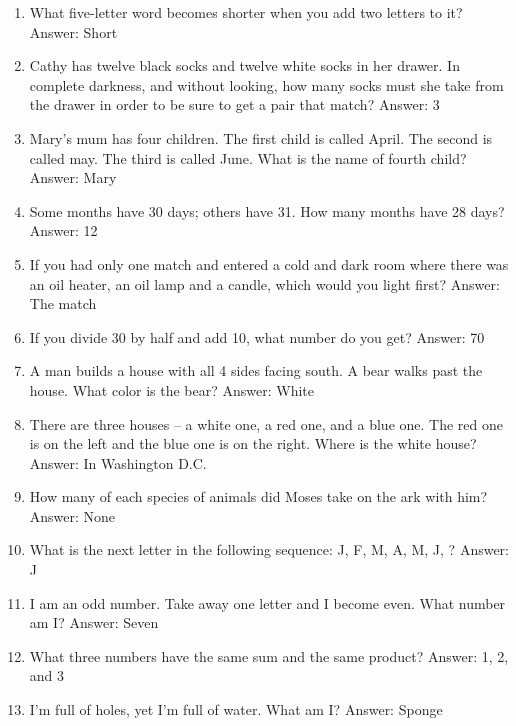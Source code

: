 \documentclass[11pt]{article}
\begin{document}
\begin{enumerate}[label = \arabic*. ]
\item What five-letter word becomes shorter when you add two letters to it? \hfill Answer: Short

\item Cathy has twelve black socks and twelve white socks in her drawer. In complete darkness, and without looking, how many socks must she take from the drawer in order to be sure to get a pair that match?  \hfill Answer: 3

\item Mary's mum has four children. The first child is called April. The second is called may. The third is called June. What is the name of fourth child? \hfill Answer: Mary

\item Some months have 30 days; others have 31. How many months have 28 days? \hfill Answer: 12

\item If you had only one match and entered a cold and dark room where there was an oil heater, an oil lamp and a candle, which would you light first? \hfill Answer: The match

\item If you divide 30 by half and add 10, what number do you get? \hfill Answer: 70

\item A man builds a house with all 4 sides facing south. A bear walks past the house. What color is the bear? \hfill Answer: White

\item There are three houses -- a white one, a red one, and a blue one. The red one is on the left and the blue one is on the right. Where is the white house? \hfill Answer: In Washington D.C.

\item How many of each species of animals did Moses take on the ark with him? \hfill Answer: None

\item What is the next letter in the following sequence: J, F, M, A, M, J, \blank? \hfill Answer: J

\item I am an odd number. Take away one letter and I become even. What number am I? \hfill Answer: Seven 

\item What three numbers have the same sum and the same product? \hfill Answer: 1, 2, and 3

\item I'm full of holes, yet I'm full of water. What am I? \hfill Answer: Sponge 


\end{enumerate}
\end{document}

